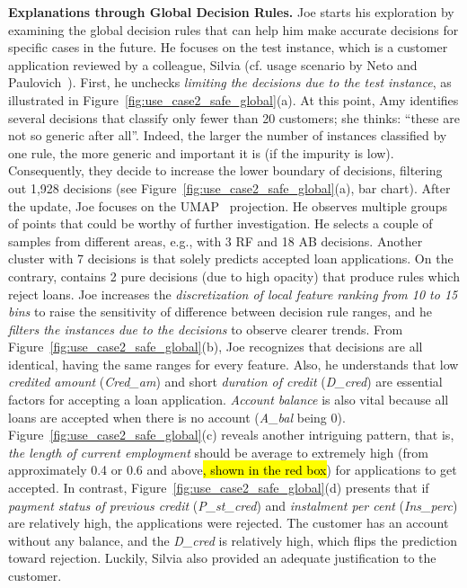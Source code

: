 \textbf{Explanations through Global Decision Rules.} Joe starts his exploration by examining the global decision rules that can help him make accurate decisions for specific cases in the future. 
He focuses on the  test instance, which is a customer application reviewed by a colleague, Silvia (cf. usage scenario by Neto and Paulovich~\cite{Neto2021Explainable}). First, he unchecks \emph{limiting the decisions due to the test instance}, as illustrated in Figure~\ref{fig:use_case2_safe_global}(a). At this point, Amy identifies several decisions that classify only fewer than 20 customers; she thinks: ``these are not so generic after all''. Indeed, the larger the number of instances classified by one rule, the more generic and important it is (if the impurity is low). Consequently, they decide to increase the lower boundary of decisions, filtering out 1,928 decisions (see Figure~\ref{fig:use_case2_safe_global}(a), bar chart). After the update, Joe focuses on the UMAP~\cite{McInnes2018UMAP} projection. He observes multiple groups of points that could be worthy of further investigation. He selects a couple of samples from different areas, e.g.,  with 3 RF and 18 AB decisions. Another cluster with 7 decisions is  that solely predicts accepted loan applications. On the contrary,  contains 2 pure decisions (due to high opacity) that produce rules which reject loans. Joe increases the \emph{discretization of local feature ranking from 10 to 15 bins} to raise the sensitivity of difference between decision rule ranges, and he \emph{filters the instances due to the decisions} to observe clearer trends. From Figure~\ref{fig:use_case2_safe_global}(b), Joe recognizes that  decisions are all identical, having the same ranges for every feature. Also, he understands that low \emph{credited amount} (\emph{Cred\_am}) and short \emph{duration of credit} (\emph{D\_cred}) are essential factors for accepting a loan application. \emph{Account balance} is also vital because all loans are accepted when there is no account (\emph{A\_bal} being 0). Figure~\ref{fig:use_case2_safe_global}(c) reveals another intriguing pattern, that is, \emph{the length of current employment} should be average to extremely high (from approximately 0.4 or 0.6 and above\hl{, shown in the red box}) for applications to get accepted. In contrast, Figure~\ref{fig:use_case2_safe_global}(d) presents that if \emph{payment status of previous credit} (\emph{P\_st\_cred}) and \emph{instalment per cent} (\emph{Ins\_perc}) are relatively high, the applications were rejected. The  customer has an account without any balance, and the \emph{D\_cred} is relatively high, which flips the prediction toward rejection. Luckily, Silvia also provided an adequate justification to the customer.~\cite{Neto2021Explainable}

